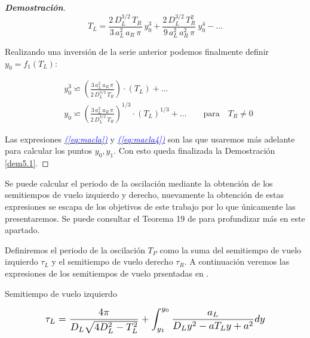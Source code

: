 \documentclass[12pt,a4paper]{report} %
\newcommand{\eref}[1]{\hyperref[#1]{\textcolor{blue}{\textit{(\ref*{#1})}}}}
\begin{document}
\begin{proof}[\textbf{Demostración}]
	\begin{equation}
		\label{macla3}
		T_L=\frac{2\, D_L^{3/2}\, T_R}{3\, a_L^2\, a_R \, \pi}\: y_0^3+\frac{2\, D_L^{3/2}\, T_R^2}{9\, a_L^2\, a_R^2 \, \pi}\: y_0^4-...
	\end{equation}\smallskip
	
	\vspace{0.5cm}\noindent Realizando una inversión de la serie  anterior podemos finalmente definir $y_0=f_1(T_L)$:
	
	\begin{equation}
		\label{eq:macla4}
		\begin{aligned}
		&y_0^3\backsimeq \left( \frac{3\, a_L^2\, a_R \, \pi}{2\, D_L^{3/2}\, T_R} \right)\cdot \left(T_L\right)+...\\[3mm]
		&y_0\backsimeq \left( \frac{3\, a_L^2\, a_R \, \pi}{2\, D_L^{3/2}\, T_R} \right)^{1/3}\cdot \left(T_L\right)^{1/3}+... \qquad \text{para} \quad T_R \neq 0
	\end{aligned}
	\end{equation}
	
	\vspace{0.5cm}Las expresiones \eref{eq:macla} y \eref{eq:macla4} son las que usaremos más adelante para calcular los puntos $y_0,y_1$. Con esto queda finalizada la Demostración \ref{dem5.1}.
	
	\end{proof}
	
	\vspace{0.5cm}Se puede calcular el periodo de la oscilación mediante la obtención de los semitiempos de vuelo izquierdo y derecho, nuevamente la obtención de estas expresiones se escapa de los objetivos de este trabajo por lo que  únicamente las presentaremos. Se puede consultar el Teorema 19 de \cite{caracterizacion} para profundizar más en este apartado.
	
	\vspace{0.5cm} Definiremos el periodo de la oscilación $T_P$ como la suma del semitiempo de vuelo izquierdo $\tau_L$ y el semitiempo de vuelo derecho $\tau_R$. A continuación veremos las expresiones de los semitiempos de vuelo prsentadas en \cite{caracterizacion}.
	
	\vspace{0.5cm}\noindent Semitiempo de vuelo izquierdo
	
	\begin{equation}
		\label{eq:semitiempoL}
		\scalebox{1.2}{$\displaystyle
		\tau_L=\frac{4\pi}{D_L\sqrt{4D_L^2-T_L^2}}+\int_{y_1}^{y_0}\frac{a_L}{D_Ly^2-aT_Ly+a^2}dy
		$}
	\end{equation}\smallskip
	
\end{document}
